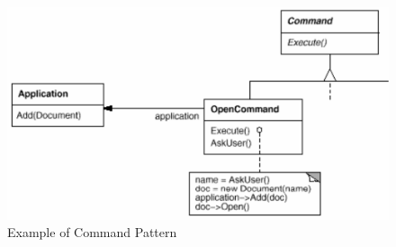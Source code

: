 \documentclass[11pt]{article}
\begin{document}
\begin{figure}[htbp]
\centering
\includegraphics[width=.9\linewidth]{img/example_of_command.png}
\caption{\label{fig:example-of-command-pattern}Example of Command Pattern}
\end{figure}
\end{document}
